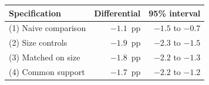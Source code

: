 \begin{tabular}{lrr}
\toprule
Specification & Differential & 95\% interval \\
\midrule
(1) Naive comparison & $-1.1$~pp & $-1.5$ to $-0.7$ \\
(2) Size controls & $-1.9$~pp & $-2.3$ to $-1.5$ \\
(3) Matched on size & $-1.8$~pp & $-2.2$ to $-1.3$ \\
(4) Common support & $-1.7$~pp & $-2.2$ to $-1.2$ \\
\bottomrule
\end{tabular}

